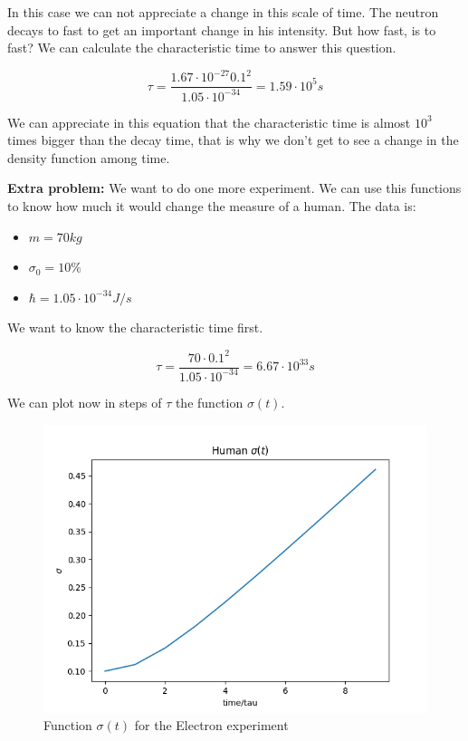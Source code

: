 In this case we can not appreciate a change in this scale of time. The neutron decays to fast to get an important change in his intensity. But how fast, is to fast? We can calculate the characteristic time to answer this question.

\begin{equation}
    \tau = \frac{1.67 \cdot 10^{-27} 0.1^2}{1.05 \cdot 10^{-34}} = 1.59 \cdot 10^5 s
\end{equation}

We can appreciate in this equation that the characteristic time is almost $10^3$ times bigger than the decay time, that is why we don't get to see a change in the density function among time.

\textbf{Extra problem: } We want to do one more experiment. We can use this functions to know how much it would change the measure of a human. The data is:

\begin{itemize}
    \item $m = 70 kg$
    \item $ \sigma_0 = 10\% $
    \item $\hbar = 1.05 \cdot 10^{-34} J/s$
\end{itemize}

We want to know the characteristic time first.

\begin{equation}
    \label{2.39}
    \tau = \frac{70\cdot 0.1^2}{1.05 \cdot 10^{-34}} = 6.67 \cdot 10^{33} s 
\end{equation}

We can plot now in steps of $\tau$ the function $\sigma(t)$.

\begin{figure}[H]
    \centering
    \includegraphics{images2/Human/sigma.png}
    \caption{Function $\sigma(t)$ for the Electron experiment}
    \label{fig:sigma_human}
\end{figure}


